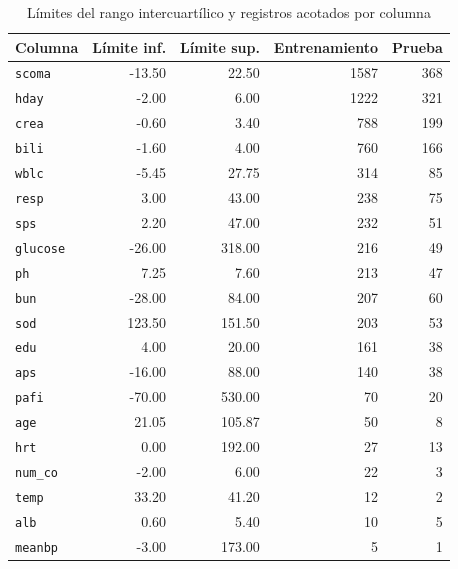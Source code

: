 \begin{table}[H]
\centering
\caption{Límites del rango intercuartílico y registros acotados por columna}
\label{tab:atipicos}
\small
\begin{tabular}{l r r r r}
\toprule
\textbf{Columna} & \textbf{Límite inf.} & \textbf{Límite sup.} & \textbf{Entrenamiento} & \textbf{Prueba} \\
\midrule
\texttt{scoma} & -13.50 & 22.50 & 1587 & 368 \\
\texttt{hday} & -2.00 & 6.00 & 1222 & 321 \\
\texttt{crea} & -0.60 & 3.40 & 788 & 199 \\
\texttt{bili} & -1.60 & 4.00 & 760 & 166 \\
\texttt{wblc} & -5.45 & 27.75 & 314 & 85 \\
\texttt{resp} & 3.00 & 43.00 & 238 & 75 \\
\texttt{sps} & 2.20 & 47.00 & 232 & 51 \\
\texttt{glucose} & -26.00 & 318.00 & 216 & 49 \\
\texttt{ph} & 7.25 & 7.60 & 213 & 47 \\
\texttt{bun} & -28.00 & 84.00 & 207 & 60 \\
\texttt{sod} & 123.50 & 151.50 & 203 & 53 \\
\texttt{edu} & 4.00 & 20.00 & 161 & 38 \\
\texttt{aps} & -16.00 & 88.00 & 140 & 38 \\
\texttt{pafi} & -70.00 & 530.00 & 70 & 20 \\
\texttt{age} & 21.05 & 105.87 & 50 & 8 \\
\texttt{hrt} & 0.00 & 192.00 & 27 & 13 \\
\texttt{num\_co} & -2.00 & 6.00 & 22 & 3 \\
\texttt{temp} & 33.20 & 41.20 & 12 & 2 \\
\texttt{alb} & 0.60 & 5.40 & 10 & 5 \\
\texttt{meanbp} & -3.00 & 173.00 & 5 & 1 \\
\bottomrule
\end{tabular}
\end{table}
